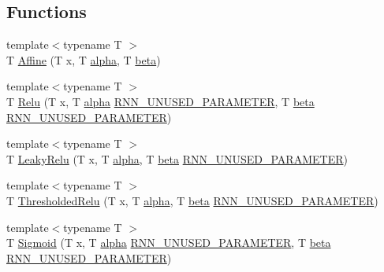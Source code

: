 \subsection*{Functions}
\begin{DoxyCompactItemize}
\item 
{\footnotesize template$<$typename T $>$ }\\T \mbox{\hyperlink{namespaceonnxruntime_1_1rnn_1_1detail_acee1bdb20af93bee27f5abad6459b3b6}{Affine}} (T x, T \mbox{\hyperlink{mlasi_8h_a1763355f32e1812e5cb3a0080e7cca12}{alpha}}, T \mbox{\hyperlink{mlasi_8h_a5fd37d216981b4cd9a19e29b5acd48d4}{beta}})
\item 
{\footnotesize template$<$typename T $>$ }\\T \mbox{\hyperlink{namespaceonnxruntime_1_1rnn_1_1detail_a7339c2c8e1979ae1963c881aeb76ac1f}{Relu}} (T x, T \mbox{\hyperlink{mlasi_8h_a1763355f32e1812e5cb3a0080e7cca12}{alpha}} \mbox{\hyperlink{rnn__activation__functors_8h_a2f7cd9def0156219f0b79c6ed32a1d22}{R\+N\+N\+\_\+\+U\+N\+U\+S\+E\+D\+\_\+\+P\+A\+R\+A\+M\+E\+T\+ER}}, T \mbox{\hyperlink{mlasi_8h_a5fd37d216981b4cd9a19e29b5acd48d4}{beta}} \mbox{\hyperlink{rnn__activation__functors_8h_a2f7cd9def0156219f0b79c6ed32a1d22}{R\+N\+N\+\_\+\+U\+N\+U\+S\+E\+D\+\_\+\+P\+A\+R\+A\+M\+E\+T\+ER}})
\item 
{\footnotesize template$<$typename T $>$ }\\T \mbox{\hyperlink{namespaceonnxruntime_1_1rnn_1_1detail_a9f41ca5475b0bbf5ee96bcbce50dd4e5}{Leaky\+Relu}} (T x, T \mbox{\hyperlink{mlasi_8h_a1763355f32e1812e5cb3a0080e7cca12}{alpha}}, T \mbox{\hyperlink{mlasi_8h_a5fd37d216981b4cd9a19e29b5acd48d4}{beta}} \mbox{\hyperlink{rnn__activation__functors_8h_a2f7cd9def0156219f0b79c6ed32a1d22}{R\+N\+N\+\_\+\+U\+N\+U\+S\+E\+D\+\_\+\+P\+A\+R\+A\+M\+E\+T\+ER}})
\item 
{\footnotesize template$<$typename T $>$ }\\T \mbox{\hyperlink{namespaceonnxruntime_1_1rnn_1_1detail_a14c14ab8f759d0122eede02498ddb8ef}{Thresholded\+Relu}} (T x, T \mbox{\hyperlink{mlasi_8h_a1763355f32e1812e5cb3a0080e7cca12}{alpha}}, T \mbox{\hyperlink{mlasi_8h_a5fd37d216981b4cd9a19e29b5acd48d4}{beta}} \mbox{\hyperlink{rnn__activation__functors_8h_a2f7cd9def0156219f0b79c6ed32a1d22}{R\+N\+N\+\_\+\+U\+N\+U\+S\+E\+D\+\_\+\+P\+A\+R\+A\+M\+E\+T\+ER}})
\item 
{\footnotesize template$<$typename T $>$ }\\T \mbox{\hyperlink{namespaceonnxruntime_1_1rnn_1_1detail_a56295ec3957f0ec0aa90b43ee8faaaae}{Sigmoid}} (T x, T \mbox{\hyperlink{mlasi_8h_a1763355f32e1812e5cb3a0080e7cca12}{alpha}} \mbox{\hyperlink{rnn__activation__functors_8h_a2f7cd9def0156219f0b79c6ed32a1d22}{R\+N\+N\+\_\+\+U\+N\+U\+S\+E\+D\+\_\+\+P\+A\+R\+A\+M\+E\+T\+ER}}, T \mbox{\hyperlink{mlasi_8h_a5fd37d216981b4cd9a19e29b5acd48d4}{beta}} \mbox{\hyperlink{rnn__activation__functors_8h_a2f7cd9def0156219f0b79c6ed32a1d22}{R\+N\+N\+\_\+\+U\+N\+U\+S\+E\+D\+\_\+\+P\+A\+R\+A\+M\+E\+T\+ER}})

\end{DoxyCompactItemize}
